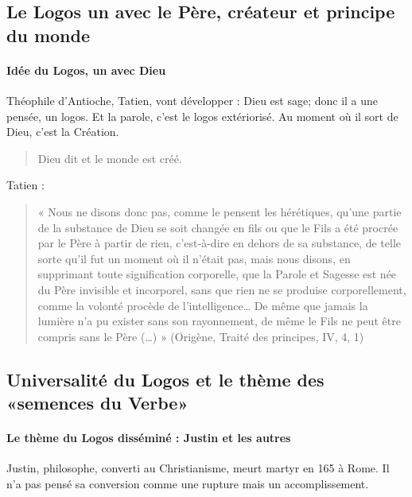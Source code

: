 \subsection{Le Logos un avec le Père, créateur et principe du monde}

 \paragraph{Idée du Logos, un avec Dieu} Théophile d'Antioche, Tatien, vont développer : Dieu est sage; donc il a une pensée, un logos. Et la parole, c'est le logos extériorisé. Au moment où il sort de Dieu, c'est la Création. 
 \begin{quote}
     Dieu dit et le monde est créé.
 \end{quote}

 Tatien : 


 
\begin{quote}
    « Nous ne disons donc pas, comme le pensent les hérétiques, qu’une partie de la substance de
Dieu se soit changée en fils ou que le Fils a été procrée par le Père à partir de rien, c’est-à-dire
en dehors de sa substance, de telle sorte qu’il fut un moment où il n’était pas, mais nous
disons, en supprimant toute signification corporelle, que la Parole et Sagesse est née du Père
invisible et incorporel, sans que rien ne se produise corporellement, comme la volonté
procède de l’intelligence… De même que jamais la lumière n’a pu exister sans son
rayonnement, de même le Fils ne peut être compris sans le Père (…) » (Origène, Traité des
principes, IV, 4, 1)
\end{quote}


\subsection{Universalité du Logos et le thème des «semences du Verbe»}

 \paragraph{Le thème du Logos disséminé : Justin et les autres} Justin, philosophe, converti au Christianisme, meurt martyr en 165 à Rome. Il n'a pas pensé sa conversion comme une rupture mais un accomplissement. 

